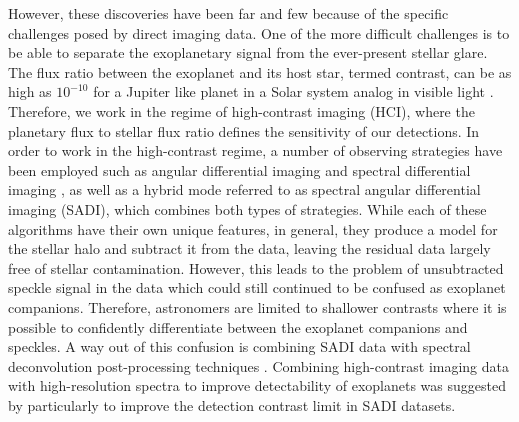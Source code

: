 \documentclass{aa}
\begin{document}
However, these discoveries have been far and few because of the specific challenges posed by direct imaging data.
One of the more difficult challenges is to be able to separate the exoplanetary signal from the ever-present stellar glare.
The flux ratio between the exoplanet and its host star, termed contrast, can be as high as $10^{-10}$ for a Jupiter like planet in a Solar system analog in visible light \citep[ for e.g][]{2023Galicher}.
Therefore, we work in the regime of high-contrast imaging (HCI), where the planetary flux to stellar flux ratio defines the sensitivity of our detections.
In order to work in the high-contrast regime, a number of observing strategies have been employed such as angular differential imaging \citep[ADI, ][]{2006MaroisADI} and spectral differential imaging \citep[SDI, ][]{2002SparksSDI}, as well as a hybrid mode referred to as spectral angular differential imaging (SADI), which combines both types of strategies.
While each of these algorithms have their own unique features, in general, they produce a model for the stellar halo and subtract it from the data, leaving the residual data largely free of stellar contamination.
However, this leads to the problem of unsubtracted speckle signal in the data which could still continued to be confused as exoplanet companions.
Therefore, astronomers are limited to shallower contrasts where it is possible to confidently differentiate between the exoplanet companions and speckles.
A way out of this confusion is combining SADI data with spectral deconvolution post-processing techniques \cite[e.g., ][]{2002SparksSDI, 2007ThatteSDI}.
Combining high-contrast imaging data with high-resolution spectra to improve detectability of exoplanets was suggested by \cite{2015Snellen} particularly to improve the detection contrast limit in SADI datasets.
\end{document}
